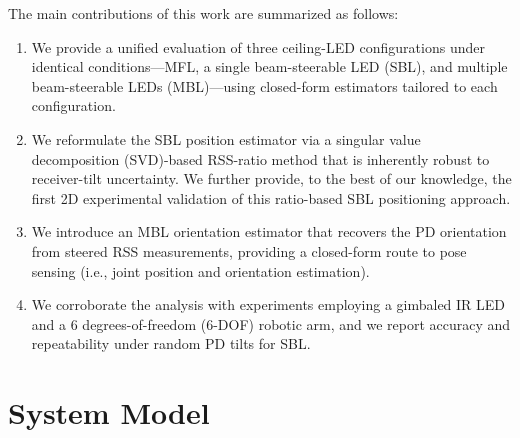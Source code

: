 \documentclass[conference]{IEEEtran}
\begin{document}

The main contributions of this work are summarized as follows:
\begin{enumerate}
    \item We provide a unified evaluation of three ceiling-LED configurations under identical conditions—MFL, a single beam-steerable LED (SBL), and multiple beam-steerable LEDs (MBL)—using closed-form estimators tailored to each configuration.

    \item We reformulate the SBL position estimator via a singular value decomposition (SVD)-based RSS-ratio method that is inherently robust to receiver-tilt uncertainty. We further provide, to the best of our knowledge, the first 2D experimental validation of this ratio-based SBL positioning approach.
        
    \item We introduce an MBL orientation estimator that recovers the PD orientation from steered RSS measurements, providing a closed-form route to pose sensing (i.e., joint position and orientation estimation).
    
    \item We corroborate the analysis with experiments employing a gimbaled IR LED and a 6 degrees-of-freedom (6-DOF) robotic arm, and we report accuracy and repeatability under random PD tilts for SBL.
    
\end{enumerate}



\section{System Model}
\end{document}
